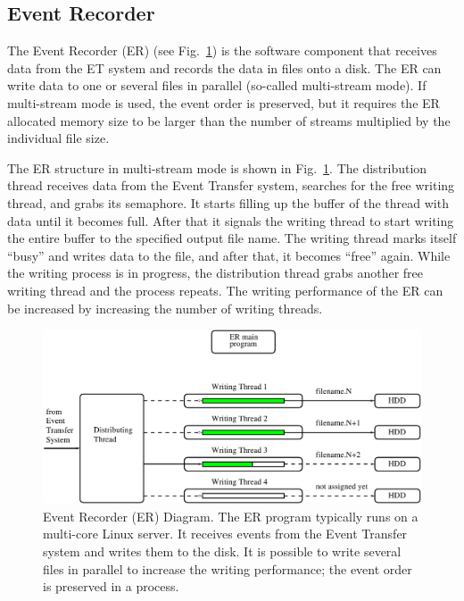\subsection{Event Recorder}

The Event Recorder (ER) (see Fig.~\ref{fig:er_diagram}) is the software component that receives data from the ET
system and records the data in files onto a disk. The ER can write data to one or several files in parallel (so-called
multi-stream mode). If multi-stream mode is used, the event order is preserved, but it requires the ER allocated memory
size to be larger than the number of streams multiplied by the individual file size.

The ER structure in multi-stream mode is shown in Fig.~\ref{fig:er_diagram}. The distribution thread receives data from
the Event Transfer system, searches for the free writing thread, and grabs its semaphore. It starts filling up the buffer
of the thread with data until it becomes full. After that it signals the writing thread to start writing the entire buffer to
the specified output file name. The writing thread marks itself ``busy'' and writes data to the file, and after that, it
becomes ``free'' again. While the writing process is in progress, the distribution thread grabs another free writing
thread and the process repeats. The writing performance of the ER can be increased by increasing the number of writing
threads.

\begin{figure}[hbt]
	\centering
	\includegraphics[width=1.0\columnwidth,keepaspectratio]{img/er_diagram.pdf}
	\caption{Event Recorder (ER) Diagram. The ER program typically runs on a multi-core Linux server. It receives
          events from the Event Transfer system and writes them to the disk. It is possible to write several files in parallel
          to increase the writing performance; the event order is preserved in a process.}
	\label{fig:er_diagram}
\end{figure}


